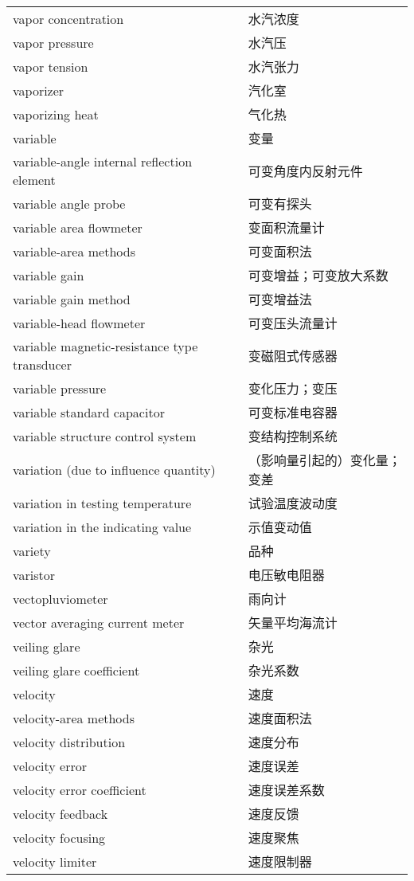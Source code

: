 \documentclass[
]{article}
\begin{document}
\begin{longtable}[]{@{}ll@{}}
vapor concentration & 水汽浓度 \\
vapor pressure & 水汽压 \\
vapor tension & 水汽张力 \\
vaporizer & 汽化室 \\
vaporizing heat & 气化热 \\
variable & 变量 \\
variable-angle internal reflection element & 可变角度内反射元件 \\
variable angle probe & 可变有探头 \\
variable area flowmeter & 变面积流量计 \\
variable-area methods & 可变面积法 \\
variable gain & 可变增益；可变放大系数 \\
variable gain method & 可变增益法 \\
variable-head flowmeter & 可变压头流量计 \\
variable magnetic-resistance type transducer & 变磁阻式传感器 \\
variable pressure & 变化压力；变压 \\
variable standard capacitor & 可变标准电容器 \\
variable structure control system & 变结构控制系统 \\
variation (due to influence quantity) & （影响量引起的）变化量；变差 \\
variation in testing temperature & 试验温度波动度 \\
variation in the indicating value & 示值变动值 \\
variety & 品种 \\
varistor & 电压敏电阻器 \\
vectopluviometer & 雨向计 \\
vector averaging current meter & 矢量平均海流计 \\
veiling glare & 杂光 \\
veiling glare coefficient & 杂光系数 \\
velocity & 速度 \\
velocity-area methods & 速度面积法 \\
velocity distribution & 速度分布 \\
velocity error & 速度误差 \\
velocity error coefficient & 速度误差系数 \\
velocity feedback & 速度反馈 \\
velocity focusing & 速度聚焦 \\
velocity limiter & 速度限制器 \\

\end{longtable}
\end{document}
